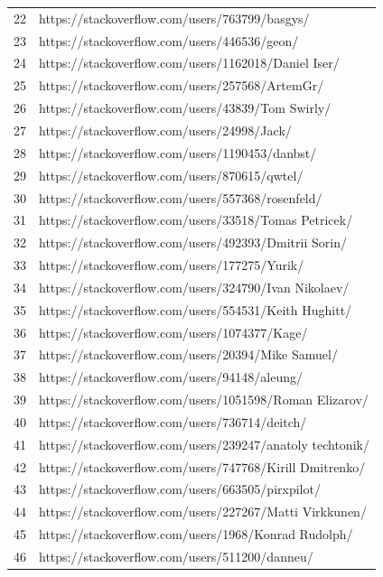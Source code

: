 \begin{center}
\begin{longtable}{|p{1.5cm}|p{12.5cm}|}
        22 & https://stackoverflow.com/users/763799/basgys/ \\
        23 & https://stackoverflow.com/users/446536/geon/ \\
        24 & https://stackoverflow.com/users/1162018/Daniel Iser/ \\
        25 & https://stackoverflow.com/users/257568/ArtemGr/ \\
        26 & https://stackoverflow.com/users/43839/Tom Swirly/ \\
        27 & https://stackoverflow.com/users/24998/Jack/ \\
        28 & https://stackoverflow.com/users/1190453/danbst/  \\
        29 & https://stackoverflow.com/users/870615/qwtel/  \\
        30 & https://stackoverflow.com/users/557368/rosenfeld/  \\
        31 & https://stackoverflow.com/users/33518/Tomas Petricek/  \\
        32 & https://stackoverflow.com/users/492393/Dmitrii Sorin/  \\
        33 & https://stackoverflow.com/users/177275/Yurik/ \\
        34 & https://stackoverflow.com/users/324790/Ivan Nikolaev/ \\
        35 & https://stackoverflow.com/users/554531/Keith Hughitt/ \\
        36 & https://stackoverflow.com/users/1074377/Kage/ \\
        37 & https://stackoverflow.com/users/20394/Mike Samuel/ \\
        38 & https://stackoverflow.com/users/94148/aleung/ \\
        39 & https://stackoverflow.com/users/1051598/Roman  Elizarov/ \\
        40 & https://stackoverflow.com/users/736714/deitch/ \\
        41 & https://stackoverflow.com/users/239247/anatoly techtonik/ \\
        42 & https://stackoverflow.com/users/747768/Kirill Dmitrenko/ \\
        43 & https://stackoverflow.com/users/663505/pirxpilot/ \\
        44 & https://stackoverflow.com/users/227267/Matti Virkkunen/ \\
        45 & https://stackoverflow.com/users/1968/Konrad Rudolph/ \\
        46 & https://stackoverflow.com/users/511200/danneu/ \\

\end{longtable}
\end{center}
